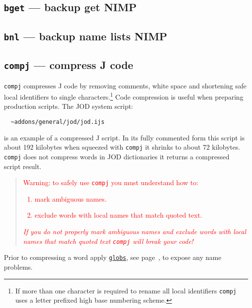 \subsection{\texttt{bget} --- backup get NIMP}\label{ss:bget}   

\subsection{\texttt{bnl} --- backup name lists NIMP}\label{ss:bnl}    

\subsection{\texttt{compj} --- compress J code}

  \texttt{compj} compresses J code by
  removing comments, white space and shortening safe local identifiers to single
  characters.\footnote{If more than one character is required to rename all
  local identifiers \texttt{compj} uses a letter prefixed high base numbering scheme. }
  Code compression is useful when preparing production scripts. The
  JOD system script:
  
\begin{verbatim}
  ~addons/general/jod/jod.ijs
\end{verbatim}

  is an example of a compressed J script. In its fully commented
  form this script is about 192 kilobytes when squeezed with
  \texttt{compj} it shrinks to about 72 kilobytes.
  \texttt{compj} does not compress words in JOD
  dictionaries it returns a compressed script result.
  
\begin{quotation}
 \noindent\textcolor{red}{Warning: to safely use
	  \texttt{compj} you must understand how to:
     \begin{enumerate} 
      \item mark ambiguous names.
      \item exclude words with local names that
        match quoted text. 
     \end{enumerate}
	  \emph{If you do not properly mark ambiguous names and exclude words
     with local names that match quoted text 
    \texttt{compj} will break your code!}}
\end{quotation}
  
  Prior to compressing a word apply \hyperlink{il:globs}{\texttt{globs}}, 
  see page~\pageref{ss:globs}, to expose any name problems.

